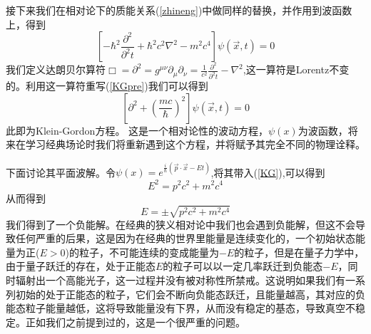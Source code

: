 接下来我们在相对论下的质能关系(\ref{zhineng})中做同样的替换，并作用到波函数上，得到
\begin{equation}
\label{KGpre}
\left[-\hbar^{2}\frac{\partial^{2}}{\partial^{2} t}+\hbar^{2}c^{2}\nabla^{2}-m^2c^{4}\right]\psi(\vec{x},t)=0
\end{equation}
我们定义达朗贝尔算符$\Box=\partial^{2}=g^{\mu\nu}\partial_{\mu}\partial_{\nu}=\frac{1}{c^{2}}\frac{\partial^{2}}{\partial^{2} t}-\nabla^{2}$,这一算符是Lorentz不变的。利用这一算符重写(\ref{KGpre})我们可以得到
\begin{equation}
    \label{KG}
      \left[\partial^{2}+\left(\frac{mc}{\hbar}\right)^{2}\right]\psi(\vec{x},t)=0
\end{equation}
此即为Klein-Gordon方程。
这是一个相对论性的波动方程，$\psi(x)$为波函数，将来在学习经典场论时我们将重新遇到这个方程，并将赋予其完全不同的物理诠释。

下面讨论其平面波解。令$\psi(x)=e^{\frac{i}{\hbar}(\vec{p}\cdot \vec{x}-Et)}$,将其带入(\ref{KG}),可以得到
\begin{equation}
     E^{2}=p^{2}c^{2}+m^{2}c^{4}
\end{equation}
从而得到
\begin{equation}
    E=\pm \sqrt{p^{2}c^{2}+m^{2}c^{4}}
\end{equation}
我们得到了一个负能解。在经典的狭义相对论中我们也会遇到负能解，但这不会导致任何严重的后果，这是因为在经典的世界里能量是连续变化的，一个初始状态能量为正($E>0$)的粒子，不可能连续的变成能量为$-E$的粒子，但是在量子力学中，由于量子跃迁的存在，处于正能态$E$的粒子可以以一定几率跃迁到负能态$-E$，同时辐射出一个高能光子，这一过程并没有被对称性所禁戒。这说明如果我们有一系列初始的处于正能态的粒子，它们会不断向负能态跃迁，且能量越高，其对应的负能态粒子能量越低，这将导致能量没有下界，从而没有稳定的基态，导致真空不稳定。正如我们之前提到过的，这是一个很严重的问题。

